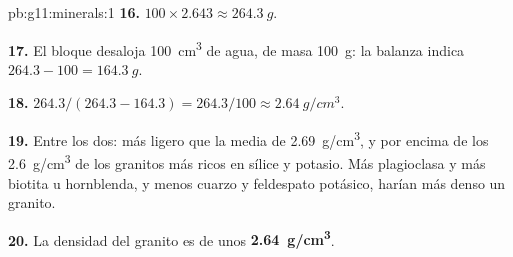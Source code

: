 \begin{solution}{pb:g11:minerals:1}
\textbf{16.} $100 \times 2.643 \approx \qty{264.3}{g}$.

\textbf{17.} El bloque desaloja \qty{100}{cm^3} de agua, de masa
\qty{100}{g}: la balanza indica $264.3 - 100 = \qty{164.3}{g}$.

\textbf{18.} $264.3/(264.3 - 164.3) = 264.3/100 \approx \qty{2.64}{g/cm^3}$.

\textbf{19.} Entre los dos: más ligero que la media de \qty{2.69}{g/cm^3}, y
por encima de los \qty{2.6}{g/cm^3} de los granitos más ricos en sílice y
potasio. Más plagioclasa y más biotita u hornblenda, y menos cuarzo y
feldespato potásico, harían más denso un granito.

\textbf{20.} La densidad del granito es de unos
\textbf{\qty{2.64}{g/cm^3}}.
\end{solution}
